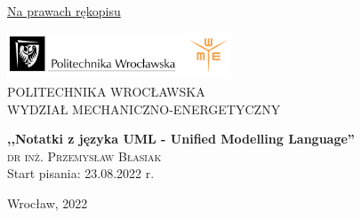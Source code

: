 \documentclass[a4paper,11pt]{report}
\begin{document}
\begin{titlepage}
\begin{flushright}
\underline{Na prawach rękopisu}
\end{flushright}
 \vspace{0.5cm}
\begin{center}

\includegraphics[width=0.5\textwidth]{figures/logo.png}\\
{\large{POLITECHNIKA WROCŁAWSKA}}\\
{\large{WYDZIAŁ MECHANICZNO-ENERGETYCZNY}}
 \vspace{5cm}

 {\LARGE\bfseries ,,Notatki z języka UML - Unified Modelling Language''\\}
 \vspace{1.5cm}
 {\Large \textsc{dr inż. Przemysław Błasiak}}\\[5pt]
 
 \vspace{1.0cm}
%
%
%
 {\Large{Start pisania: 23.08.2022 r.}}\\[5pt]
\vspace{6.0cm}

{Wrocław, 2022}
\end{center}
\end{titlepage}
\end{document}
